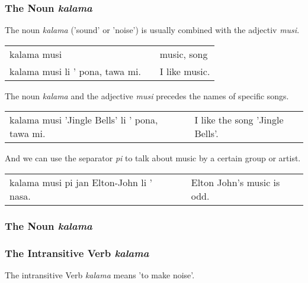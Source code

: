\subsubsection*{The Noun \textit{kalama}}
%
%
The noun \textit{kalama} ('sound' or 'noise') is usually combined with the adjectiv \textit{musi}.

\begin{supertabular}{p{5,5cm}|ll}
    kalama musi                     &  & music, song   \\
    kalama musi li ' pona, tawa mi. &  & I like music. \\
\end{supertabular}

The noun \textit{kalama} and the adjective \textit{musi} precedes the names of specific songs.

\begin{supertabular}{p{5,5cm}|ll}
    kalama musi 'Jingle Bells' li ' pona, tawa mi. &  & I like the song 'Jingle Bells'. \\
\end{supertabular}

And we can use the separator \textit{pi} to talk about music by a certain group or artist.

\begin{supertabular}{p{5,5cm}|ll}
    kalama musi pi jan Elton-John li ' nasa. &  & Elton John's music is odd. \\
\end{supertabular}

\subsubsection*{The Noun \textit{kalama}}
%
%
\subsubsection*{The Intransitive Verb \textit{kalama}}
%
%

The intransitive Verb \textit{kalama} means 'to make noise'.

